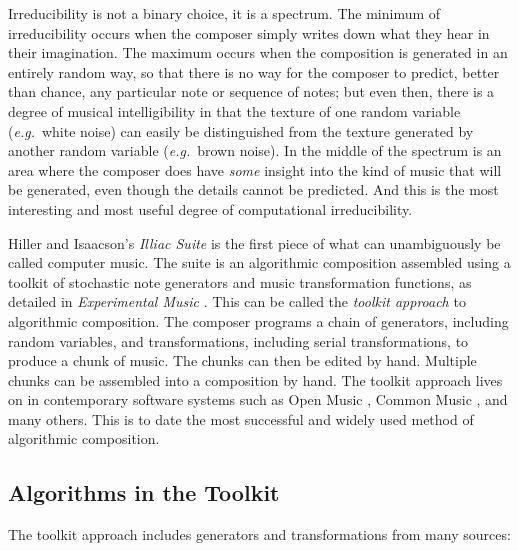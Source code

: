 \documentclass[11pt,papersize=a4]{scrartcl}
\begin{document}
Irreducibility is not a binary choice, it is a spectrum. The minimum of irreducibility occurs when the composer simply writes down what they hear in their imagination. The maximum occurs when the composition is generated in an entirely random way, so that there is no way for the composer to predict, better than chance, any particular note or sequence of notes; but even then, there is a degree of musical intelligibility in that the texture of one random variable (\emph{e.g.}\ white noise) can easily be distinguished from the texture generated by another random variable (\emph{e.g.}\ brown noise). In the middle of the spectrum is an area where the composer does have \emph{some} insight into the kind of music that will be generated, even though the details cannot be predicted. And this is the most interesting and most useful degree of computational irreducibility. 

Hiller and Isaacson's \emph{Illiac Suite} \parencite{illiacsuite} is the first piece of what can unambiguously be called computer music. The suite is an algorithmic composition assembled using a toolkit of stochastic note generators and music transformation functions, as detailed in \emph{Experimental Music} \parencite{hiller}. This can be called the \emph{toolkit approach} to algorithmic composition. The composer programs a chain of generators, including random variables, and transformations, including serial transformations, to produce a chunk of music. The chunks can then be edited by hand. Multiple chunks can be assembled into a composition by hand. The toolkit approach lives on in contemporary software systems such as Open Music \parencite{OpenMusic}, Common Music \parencite{CommonMusic, musx}, and many others. This is to date the most successful and widely used method of algorithmic composition. 

\subsection*{Algorithms in the Toolkit}

The toolkit approach includes generators and transformations from many sources:
\end{document}
